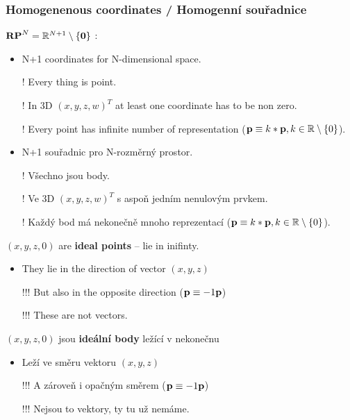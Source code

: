 \begin{frame}\frametitle{Homogenenous coordinates / Homogenní souřadnice}\scriptsize
  $\mathbf{RP}^N = \mathbb{R}^{N+1} \setminus \{\mathbf{0}\}$ :
  \begin{itemize}
    \item N+1 coordinates for N-dimensional space.
    \item[\color{red}!] Every thing is point.
    \item[\color{red}!] In 3D $(x, y, z, w)^T$ at least one coordinate has to be non zero.
    \item[\color{red}!] Every point has infinite number of representation ($\mathbf{p} \equiv k*\mathbf{p}, k \in \mathbb{R} \setminus \{0\}$).
  \end{itemize}
  \begin{itemize}
    \item N+1 souřadnic pro N-rozměrný prostor.
    \item[\color{red}!] Všechno jsou body.
    \item[\color{red}!] Ve 3D $(x, y, z, w)^T$ s aspoň jedním nenulovým prvkem.
    \item[\color{red}!] Každý bod má nekonečně mnoho reprezentací ($\mathbf{p} \equiv k*\mathbf{p}, k \in \mathbb{R} \setminus \{0\}$).
  \end{itemize}
  \pause\vfill
  $(x,y,z,0)$ are \textbf{ideal points} -- lie in inifinty.
  \begin{itemize}
    \item They lie in the direction of vector $(x,y,z)$
    \item[\color{red}!!!] But also in the opposite direction ($\mathbf{p} \equiv -1\mathbf{p}$)
    \item[\color{red}!!!] These are not vectors.
  \end{itemize}
  $(x,y,z,0)$ jsou \textbf{ideální body} ležící v nekonečnu
  \begin{itemize}
    \item Leží ve směru vektoru $(x,y,z)$
    \item[\color{red}!!!] A zároveň i opačným směrem ($\mathbf{p} \equiv -1\mathbf{p}$)
    \item[\color{red}!!!] Nejsou to vektory, ty tu už nemáme.
  \end{itemize}
\end{frame}

